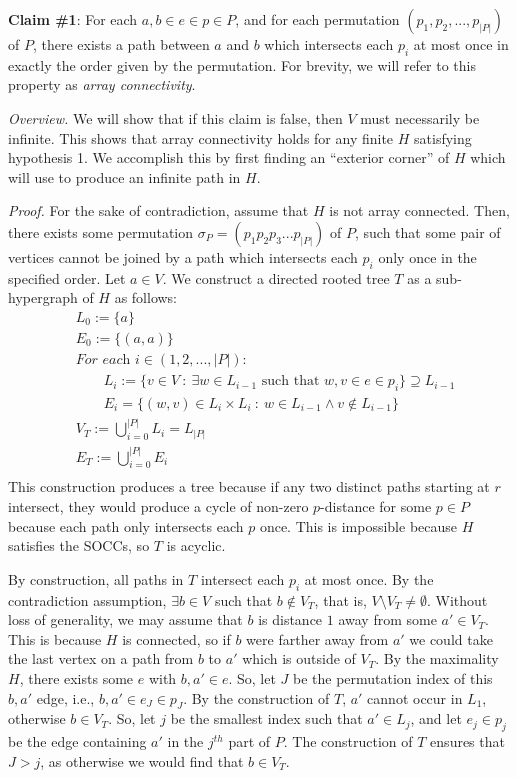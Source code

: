 \documentclass{article}
\theoremstyle{plain}
\theoremstyle{definition}
\theoremstyle{remark}
\begin{document}
	\textbf{Claim \#1}: For each $a, b \in e \in p \in P$, and for each permutation $(p_1, p_2,...,p_{|P|})$ of $P$, there exists a path between $a$ and $b$ which intersects each $p_i$ at most once in exactly the order given by the permutation. For brevity, we will refer to this property as \textit{array connectivity}.
	
	\textit{Overview.} We will show that if this claim is false, then $V$ must necessarily be infinite. This shows that array connectivity holds for any finite $H$ satisfying hypothesis 1. We accomplish this by first finding an ``exterior corner'' of $H$ which will use to produce an infinite path in $H$.
	
	\textit{Proof.} For the sake of contradiction, assume that $H$ is not array connected. Then, there exists some permutation $\sigma_P = (p_1p_2p_3...p_{|P|})$ of $P$, such that some pair of vertices cannot be joined by a path which intersects each $p_i$ only once in the specified order. 
	Let $a \in V$. We construct a directed rooted tree $T$ as a sub-hypergraph of $H$ as follows:
	\begin{equation*}
		\begin{aligned}
			&L_0 := \{a\}\\
			&E_0 := \{(a, a)\}\\
			&\textit{For each $i \in (1, 2, ..., |P|)$}:\\
			& \qquad L_i := \{v \in V \ : \ \exists w \in L_{i - 1} \text{ such that } w, v \in e \in p_{i}\} \supseteq L_{i-1}\\
			& \qquad E_i = \{ (w, v) \in L_i \times L_i \ : \ w \in L_{i-1} \wedge v \notin L_{i-1}\}\\
			&V_T := \bigcup_{i = 0}^{|P|}L_i = L_{|P|}\\
			&E_T := \bigcup_{i = 0}^{|P|}E_i\\
		\end{aligned}
	\end{equation*}
	This construction produces a tree because if any two distinct paths starting at $r$ intersect, they would produce a cycle of non-zero $p$-distance for some $p \in P$ because each path only intersects each $p$ once. This is impossible because $H$ satisfies the SOCCs, so $T$ is acyclic.
	
	By construction, all paths in $T$ intersect each $p_i$ at most once. By the contradiction assumption, $\exists b \in V$ such that $b \notin V_T$, that is, $V \setminus V_T \neq \emptyset$. Without loss of generality, we may assume that $b$ is distance $1$ away from some $a' \in V_T$. This is because $H$ is connected, so if $b$ were farther away from $a'$ we could take the last vertex on a path from $b$ to $a'$ which is outside of $V_T$. By the maximality $H$, there exists some $e$ with $b, a' \in e$. So, let $J$ be the permutation index of this $b, a'$ edge, i.e., $b, a' \in e_J \in p_J$. By the construction of $T$, $a'$ cannot occur in $L_1$, otherwise $b \in V_T$. So, let $j$ be the smallest index such that $a' \in L_j$, and let $e_j \in p_j$ be the edge containing $a'$ in the $j^{th}$ part of $P$. The construction of $T$ ensures that $J > j$, as otherwise we would find that $b \in V_T$.
	
\end{document}
